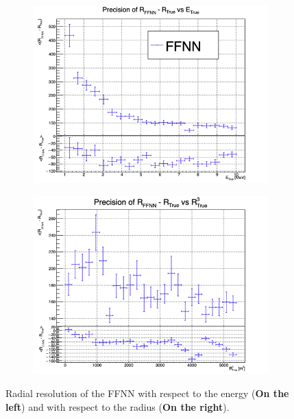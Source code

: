 \documentclass[../main.tex]{subfiles}
\begin{document}
\begin{figure}[ht]
  \centering
  \begin{subfigure}[t]{0.48\linewidth}
    \includegraphics[width=\linewidth]{images/janne/ffnn/SBE.png}
  \end{subfigure}
  \hfill
  \begin{subfigure}[t]{0.48\linewidth}
    \includegraphics[width=\linewidth]{images/janne/ffnn/SBR.png}
  \end{subfigure}
  \caption{Radial resolution of the FFNN with respect to the energy (\textbf{On the left}) and with respect to the radius (\textbf{On the right}).}
  \label{fig:janne:ffnn:SB}
\end{figure}
\end{document}
